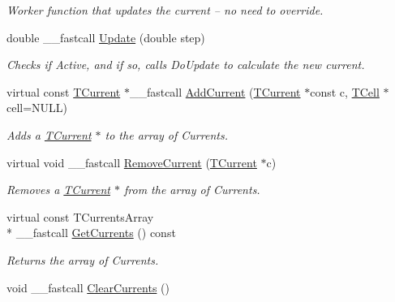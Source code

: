 \begin{DoxyCompactItemize}
\begin{DoxyCompactList}\small\item\em Worker function that updates the current -- no need to override. \end{DoxyCompactList}\item 
double \+\_\+\+\_\+fastcall \hyperlink{class_t_cell_ab65843b9b3021e0d2e614edb4ac1a18e}{Update} (double step)
\begin{DoxyCompactList}\small\item\em Checks if Active, and if so, calls Do\+Update to calculate the new current. \end{DoxyCompactList}\item 
\hypertarget{class_t_cell_ad3dc989fecc587656dfc2f8570dfe772}{virtual const \hyperlink{class_t_current}{T\+Current} $\ast$\+\_\+\+\_\+fastcall \hyperlink{class_t_cell_ad3dc989fecc587656dfc2f8570dfe772}{Add\+Current} (\hyperlink{class_t_current}{T\+Current} $\ast$const c, \hyperlink{class_t_cell}{T\+Cell} $\ast$cell=N\+U\+L\+L)}\label{class_t_cell_ad3dc989fecc587656dfc2f8570dfe772}

\begin{DoxyCompactList}\small\item\em Adds a \hyperlink{class_t_current}{T\+Current} $\ast$ to the array of Currents. \end{DoxyCompactList}\item 
\hypertarget{class_t_cell_af0d4c09293bffc70c99f12de3500edc4}{virtual void \+\_\+\+\_\+fastcall \hyperlink{class_t_cell_af0d4c09293bffc70c99f12de3500edc4}{Remove\+Current} (\hyperlink{class_t_current}{T\+Current} $\ast$c)}\label{class_t_cell_af0d4c09293bffc70c99f12de3500edc4}

\begin{DoxyCompactList}\small\item\em Removes a \hyperlink{class_t_current}{T\+Current} $\ast$ from the array of Currents. \end{DoxyCompactList}\item 
\hypertarget{class_t_cell_a010e6020a66c58784a97c7acbbf51c96}{virtual const T\+Currents\+Array \\*
\+\_\+\+\_\+fastcall \hyperlink{class_t_cell_a010e6020a66c58784a97c7acbbf51c96}{Get\+Currents} () const }\label{class_t_cell_a010e6020a66c58784a97c7acbbf51c96}

\begin{DoxyCompactList}\small\item\em Returns the array of Currents. \end{DoxyCompactList}\item 
\hypertarget{class_t_cell_a64b8f989fa47f0ee79942f5b9d2cafa8}{void \+\_\+\+\_\+fastcall \hyperlink{class_t_cell_a64b8f989fa47f0ee79942f5b9d2cafa8}{Clear\+Currents} ()}\label{class_t_cell_a64b8f989fa47f0ee79942f5b9d2cafa8}


\end{DoxyCompactItemize}
